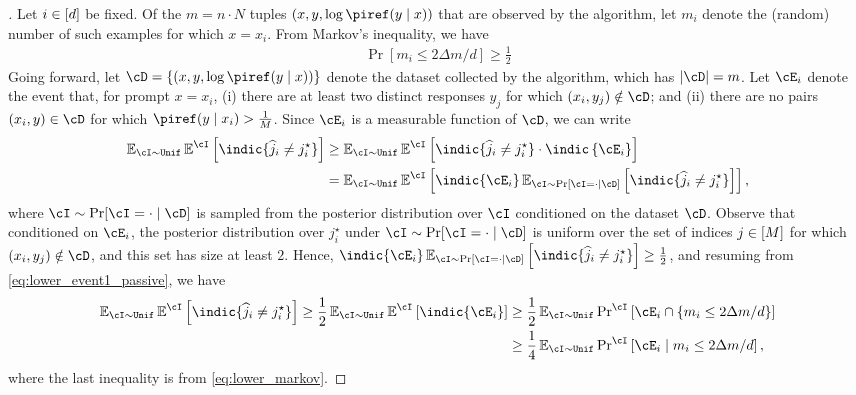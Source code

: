 \begin{proof}[]
  Let $i\in[d]$ be fixed. Of the $m=n\cdot{}N$ tuples $(x,y,\log\piref(y\mid{}x))$ that are
  observed by the algorithm,
  let $m_i$ denote the (random) number of such examples
  for which $x =x_i$.  From Markov's inequality, we have
  \begin{align}
    \label{eq:lower_markov}
    \Pr[ m_i \le 2 \Delta m/d] \ge \frac{1}{2}
  \end{align}
  Going forward, let $\cD = \crl*{(x,y,\log\piref(y\mid{}x))}$ denote
  the dataset collected by the algorithm, which has $\abs{\cD}=m$. Let $\cE_i$ denote the
  event that, for prompt $x = x_i$, (i) there are at least two
  distinct responses $y_j$ for which $(x_i,y_j) \notin \cD$; and (ii)
  there are no pairs $(x_i,y)\in\cD$ for which
  $\piref(y\mid{}x_i)>\frac{1}{M}$. Since $\cE_i$ is a measurable
  function of $\cD$, we can write
  \begin{align}
    \EnI\Enki\left[ \indic\{\wh{j}_i \ne j_i^\star\}\right]
    &\ge   \EnI\Enki\left[ \indic\{\wh{j}_i \ne j_i^\star\} \cdot \indic\left\{ \cE_i\right\}\right]\\
    &=   \EnI\Enki \left[\indic\{\cE_i\}\En_{\cI \sim \Pr[\cI=\cdot
      \mid \cD]}\left[ \indic\{\wh{j}_i \ne j^{\star}_i\}
      \right]\right],
      \label{eq:lower_event1_passive}
  \end{align}
  where $\cI \sim \Pr[\cI=\cdot \mid \cD]$ is sampled from the
  posterior distribution over $\cI$ conditioned on the dataset
  $\cD$. Observe that conditioned on $\cE_i$, the posterior
  distribution over $j_i^{\star}$ under $\cI \sim \Pr[\cI=\cdot \mid
  \cD]$ is uniform over the set of indices $j\in[M]$ for which
  $(x_i, y_j)\notin\cD$, and this set has size at least $2$. Hence, $\indic\{\cE_i\}\En_{\cI \sim \Pr[\cI=\cdot
      \mid \cD]}\left[ \indic\{\wh{j}_i \ne
      j^{\star}_i\}\right]\geq\frac{1}{2}$, and
  resuming from \cref{eq:lower_event1_passive}, we have
  \begin{align}
    \EnI\Enki\left[ \indic\{\wh{j}_i \ne j_i^\star\}\right] \ge \frac{1}{2}\EnI\Enki \left[\indic\{\cE_i\}\right] &\ge  \frac{1}{2}\EnI\Pnki \left[\cE_i \cap \crl{m_i \le 2\Delta m/d}\right] \\
                                                                                                                  &\ge \frac{1}{4} \EnI\Pnki \left[\cE_i \mid m_i \le 2\Delta m/d\right],
  \end{align}
  where the last inequality is from \cref{eq:lower_markov}.

\end{proof}

